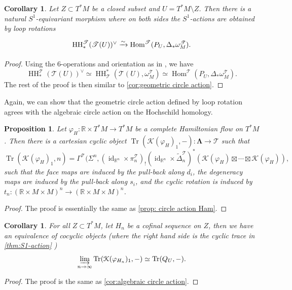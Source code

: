 \documentclass[11pt]{amsart}
\numberwithin{equation}{section}
\theoremstyle{plain}
\newtheorem{Prop}[prop]{Proposition}
\newtheorem{Coro}[coro]{Corollary}
\theoremstyle{definition}
\theoremstyle{remark}
\newcommand{\bR} { {\mathbb{R}}}
\newcommand{\cK} { {\mathcal{K}}}
\newcommand{\sT} { {\mathscr{T}}}
\newcommand{\id}{{\operatorname{id}}}
\newcommand\HH{\operatorname{HH}}
\newcommand\Tr{\operatorname{Tr}}
\newcommand\Hom{\operatorname{Hom}}
\begin{document}
\begin{Coro}\label{cor:geometric circle action tamarkin}
Let $Z \subset T^*M$ be a closed subset and $U = T^*M \setminus Z$. Then there is a natural $S^1$-equivariant morphism where on both sides the $S^1$-actions are obtained by loop rotations
\[\begin{tikzcd}
\HH_*^\sT(\sT(U))^\vee \xrightarrow{\sim} \Hom^\sT(P_U, \Delta_*\omega_{M}^\sT).
\end{tikzcd}\]
\end{Coro}
\begin{proof}
Using the 6-operations and orientation as in \cite[Corollary 7.3]{Hochschild-Kuo-Shende-Zhang}, we have 
\[\HH_*^\sT(\sT(U))^\vee \simeq \HH^*_\sT(\sT(U), \omega_M^\sT) \simeq \Hom^\sT(P_U, \Delta_*\omega_{M}^\sT).\]
The rest of the proof is then similar to \autoref{cor:geometric circle action}.
\end{proof}

Again, we can show that the geometric circle action defined by loop rotation agrees with the algebraic circle action on the Hochschild homology.

\begin{Prop}\label{prop: circle action Ham Tamarkin}
Let $\varphi_H: \bR \times  T^*M \to  T^*M$ be a complete Hamiltonian flow on $T^*M$. Then there is a cartesian cyclic object $\Tr(\cK(\varphi_H)_1,-): \boldsymbol{\Lambda} \to \sT$ such that
\[\Tr(\cK(\varphi_H)_1, n) = \Gamma^\sT(\Sigma^n, (\id_{\bR^n}\times \pi_{n}^\sT)_! (\id_{\bR^n}\times \widetilde{\Delta}_n^\sT)^* (\cK(\varphi_H) \boxtimes \cdots \boxtimes \cK(\varphi_H)),\]
such that the face maps are induced by the pull-back along $d_i$, the degeneracy maps are induced by the pull-back along $s_i$, and the cyclic rotation is induced by $t_n: (\bR \times M \times M)^n \to (\bR \times M \times M)^n$.
\end{Prop}
\begin{proof}
The proof is essentially the same as \autoref{prop: circle action Ham}.
\end{proof}

\begin{Coro}\label{cor:algebraic circle action Tamarkin}
For all $Z\subset T^*M$, let $H_n$ be a cofinal sequence on $Z$, then we have an equivalence of cocyclic objects (where the right hand side is the cyclic trace in \autoref{thm:S1-action} \cite[Theorem 1.5]{Li-Zhang26-1})
\[\varinjlim_{n\to \infty}\Tr(\cK(\varphi_{H_n})_1,-) \simeq \Tr(Q_U,-).\]
\end{Coro}
\begin{proof}
The proof is the same as \autoref{cor:algebraic circle action}.
\end{proof}
\end{document}
